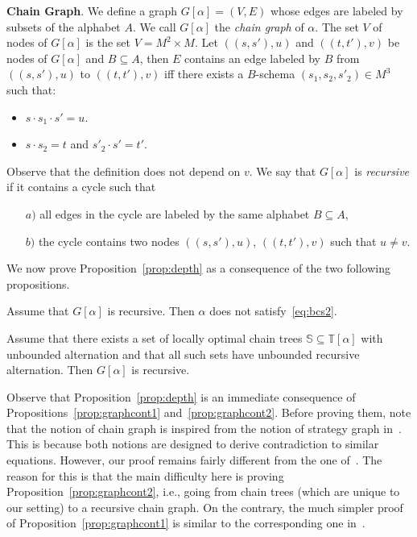 \documentclass[envcountsame]{llncs}
\newcommand\ct{\ensuremath{\mathbb{T}}\xspace}
\newcommand\cs{\ensuremath{\mathbb{S}}\xspace}
\newcommand\chain{chain\xspace}
\newcommand\Chain{Chain\xspace}
\begin{document}
\medskip
\noindent
{\bf \Chain Graph}. We define a graph $G[\alpha]=(V,E)$ whose edges
are labeled by subsets of the alphabet $A$. We call $G[\alpha]$ the
\emph{\chain graph} of $\alpha$. The set $V$ of nodes of $G[\alpha]$
is the set $V = M^2 \times M$. Let $((s,s'),u)$ and $((t,t'),v)$ be
nodes of $G[\alpha]$ and $B \subseteq A$, then $E$ contains an edge
labeled by $B$ from $((s,s'),u)$ to $((t,t'),v)$ iff there exists a
$B$-schema $(s_1,s_2,s'_2) \in M^3$ such that:

\begin{itemize}
\item $s \cdot s_1 \cdot s' = u$.
\item $s \cdot s_2= t$ and $s'_2 \cdot s' = t'$.
\end{itemize} 

Observe that the definition does not depend on $v$. We say that
$G[\alpha]$ is \emph{recursive} if it contains a cycle such that
\begin{itemize}
\item [$a)$] all edges in the cycle are labeled by the same alphabet $B
  \subseteq A$,
\item [$b)$] the cycle contains two nodes $((s,s'),u)$, $((t,t'),v)$
  such that $u \neq v$.
\end{itemize}
We now prove
Proposition~\ref{prop:depth} as a consequence of the two following 
propositions.

\begin{proposition} \label{prop:graphcont1}
  Assume that $G[\alpha]$ is recursive. Then $\alpha$ does not
  satisfy~\eqref{eq:bcs2}.
\end{proposition}

\begin{proposition} \label{prop:graphcont2}
  Assume that there exists a set of locally optimal \chain
  trees $\cs \subseteq \ct[\alpha]$ with unbounded alternation and that
  all such sets have unbounded recursive alternation. Then $G[\alpha]$
  is recursive.
\end{proposition}

Observe that Proposition~\ref{prop:depth} is an immediate consequence of
Propositions~\ref{prop:graphcont1} and~\ref{prop:graphcont2}. Before proving
them, note that the notion of \chain graph is inspired from the notion of
strategy graph in~\cite{bpopen}. This is because both notions are designed to
derive contradiction to similar equations. However, our proof remains fairly
different from the one of~\cite{bpopen}. The reason for this is that the main
difficulty here is proving Proposition~\ref{prop:graphcont2}, i.e., going from
\chain trees (which are unique to our setting) to a recursive \chain graph. On
the contrary, the much simpler proof of Proposition~\ref{prop:graphcont1} is
similar to the corresponding one in~\cite{bpopen}.
\end{document}
